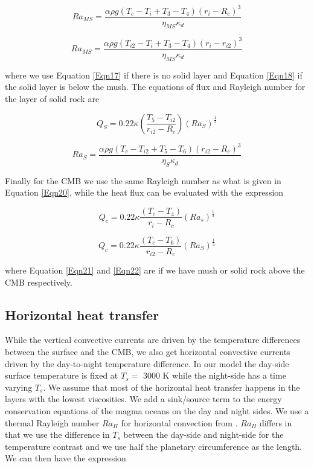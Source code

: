 \documentclass[fleqn,usenatbib]{mnras}
\begin{document}
\begin{equation}
\label{Eqn17}
Ra_{MS} = \frac{ \alpha \rho g (T_{c} - T_{i} + T_{3} - T_{4}) (r_{i} - R_{c})^{3}}{\eta_{MS} \kappa _{d}}
\end{equation}

\begin{equation}
\label{Eqn18}
Ra_{MS} = \frac{ \alpha \rho g (T_{i2} - T_{i} + T_{3} - T_{4}) (r_{i} - r_{i2})^{3}}{\eta_{MS} \kappa _{d}}
\end{equation}

\noindent where we use Equation \ref{Eqn17} if there is no solid layer and Equation \ref{Eqn18} if the solid layer is below the mush. The equations of flux and Rayleigh number for the layer of solid rock are

\begin{equation}
\label{Eqn19}
Q_{S} = 0.22 \kappa \left(\frac{T_{5} - T_{i2}}{r_{i2} - R_{c}}\right) \left(Ra_{S}\right)^{\frac{1}{3}}
\end{equation}

\begin{equation}
\label{Eqn20}
Ra_{S} = \frac{ \alpha \rho g (T_{c} - T_{i2} + T_{5} - T_{6}) (r_{i2} - R_{c})^{3}}{\eta_{S} \kappa _{d}}
\end{equation}

\noindent Finally for the CMB we use the same Rayleigh number as what is given in Equation \ref{Eqn20}, while the heat flux can be evaluated with the expression 

\begin{equation}
\label{Eqn21}
Q_{c} = 0.22 \kappa \frac{(T_{c} - T_{4})}{r_{i} - R_{c}} (Ra_{s})^{\frac{1}{3}}
\end{equation}

\begin{equation}
\label{Eqn22}
Q_{c} = 0.22 \kappa \frac{(T_{c} - T_{6})}{r_{i2} - R_{c}} (Ra_{S})^{\frac{1}{3}}
\end{equation}

\noindent where Equation \ref{Eqn21} and \ref{Eqn22} are if we have mush or solid rock above the CMB respectively. 



\subsection{Horizontal heat transfer}  \label{sec2.2}

While the vertical convective currents are driven by the temperature differences between the surface and the CMB, we also get horizontal convective currents driven by the day-to-night temperature difference. In our model the day-side surface temperature is fixed at $T_{s} =$ 3000 K while the night-side has a time varying $T_{s}$. We assume that most of the horizontal heat transfer happens in the layers with the lowest viscosities. We add a sink/source term to the energy conservation equations of the magma oceans on the day and night sides. We use a thermal Rayleigh number $Ra_{H}$ for horizontal convection from \cite{Hugh2008}. $Ra_{H}$ differs in that we use the difference in $T_{s}$ between the day-side and night-side for the temperature contrast and we use half the planetary circumference as the length. We can then have the expression   
\end{document}
